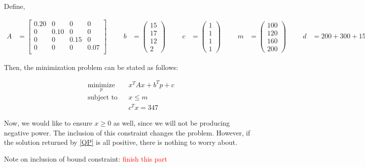 \documentclass{article}
\begin{document}
Define,

\begin{align*}
A &= 
\begin{bmatrix}
	0.20 & 0 & 0 & 0  \\ 
	0 & 0.10 & 0 & 0  \\ 
	0 & 0 & 0.15 & 0  \\ 
	0 & 0 & 0 & 0.07  \\ 
\end{bmatrix}
& & &
b &= \begin{pmatrix}
15 \\ 17 \\ 12 \\ 2
\end{pmatrix}
& & &
c &= \begin{pmatrix}
1 \\ 1 \\ 1 \\ 1
\end{pmatrix}
& & &
m &= \begin{pmatrix}
100 \\ 120 \\ 160 \\ 200
\end{pmatrix}
& & &
d &= 200 +300+150+500 = 1150
\end{align*}

Then, the minimization problem can be stated as follows:

\begin{equation}\label{QP}
\begin{aligned}
& \underset{p}{\text{minimize}}
& & x^TAx + b^Tp + c \\
& \text{subject to}
& &  x \le m\\
&&& c^Tx = 347
\end{aligned}
\end{equation}

Now, we would like to ensure $x\ge 0$ as well, since we will not be producing negative power.  The inclusion of this constraint changes the problem.  However, if the solution returned by \eqref{QP} is all positive, there is nothing to worry about.

Note on inclusion of bound constraint:
\textcolor{red}{finish this part}
\end{document}
